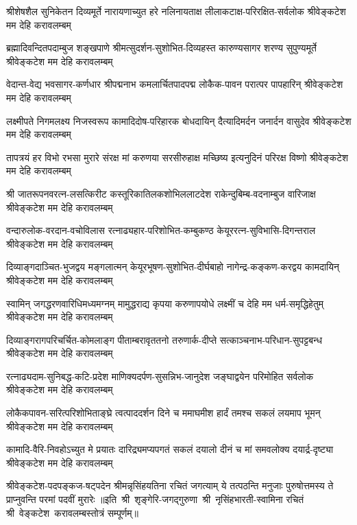 \fourlineindentedshloka
{श्रीशेषशैल सुनिकेतन दिव्यमूर्ते}
{नारायणाच्युत हरे नलिनायताक्ष}
{लीलाकटाक्ष-परिरक्षित-सर्वलोक}
{श्रीवेङ्कटेश मम देहि करावलम्बम्}

\fourlineindentedshloka
{ब्रह्मादिवन्दितपदाम्बुज शङ्खपाणे}
{श्रीमत्सुदर्शन-सुशोभित-दिव्यहस्त}
{कारुण्यसागर शरण्य सुपुण्यमूर्ते}
{श्रीवेङ्कटेश मम देहि करावलम्बम्}

\fourlineindentedshloka
{वेदान्त-वेद्य भवसागर-कर्णधार}
{श्रीपद्मनाभ कमलार्चितपादपद्म}
{लोकैक-पावन परात्पर पापहारिन्}
{श्रीवेङ्कटेश मम देहि करावलम्बम्}

\fourlineindentedshloka
{लक्ष्मीपते निगमलक्ष्य निजस्वरूप}
{कामादिदोष-परिहारक बोधदायिन्}
{दैत्यादिमर्दन जनार्दन वासुदेव}
{श्रीवेङ्कटेश मम देहि करावलम्बम्}

\fourlineindentedshloka
{तापत्रयं हर विभो रभसा मुरारे}
{संरक्ष मां करुणया सरसीरुहाक्ष}
{मच्छिष्य इत्यनुदिनं परिरक्ष विष्णो}
{श्रीवेङ्कटेश मम देहि करावलम्बम्}

\fourlineindentedshloka
{श्री जातरूपनवरत्न-लसत्किरीट}
{कस्तूरिकातिलकशोभिललाटदेश}
{राकेन्दुबिम्ब-वदनाम्बुज वारिजाक्ष}
{श्रीवेङ्कटेश मम देहि करावलम्बम्}

\fourlineindentedshloka
{वन्दारुलोक-वरदान-वचोविलास}
{रत्नाढ्यहार-परिशोभित-कम्बुकण्ठ}
{केयूररत्न-सुविभासि-दिगन्तराल}
{श्रीवेङ्कटेश मम देहि करावलम्बम्}

\fourlineindentedshloka
{दिव्याङ्गदाञ्चित-भुजद्वय मङ्गलात्मन्}
{केयूरभूषण-सुशोभित-दीर्घबाहो}
{नागेन्द्र-कङ्कण-करद्वय कामदायिन्}
{श्रीवेङ्कटेश मम देहि करावलम्बम्}

\fourlineindentedshloka
{स्वामिन् जगद्धरणवारिधिमध्यमग्नम्}
{मामुद्धराद्य कृपया करुणापयोधे}
{लक्ष्मीं च देहि मम धर्म-समृद्धिहेतुम्}
{श्रीवेङ्कटेश मम देहि करावलम्बम्}

\fourlineindentedshloka
{दिव्याङ्गरागपरिचर्चित-कोमलाङ्ग}
{पीताम्बरावृततनो तरुणार्क-दीप्ते}
{सत्काञ्चनाभ-परिधान-सुपट्टबन्ध}
{श्रीवेङ्कटेश मम देहि करावलम्बम्}

\fourlineindentedshloka
{रत्नाढ्यदाम-सुनिबद्ध-कटि-प्रदेश}
{माणिक्यदर्पण-सुसन्निभ-जानुदेश}
{जङ्घाद्वयेन परिमोहित सर्वलोक}
{श्रीवेङ्कटेश मम देहि करावलम्बम्}

\fourlineindentedshloka
{लोकैकपावन-सरित्परिशोभिताङ्घ्रे}
{त्वत्पाददर्शन दिने च ममाघमीश}
{हार्दं तमश्च सकलं लयमाप भूमन्}
{श्रीवेङ्कटेश मम देहि करावलम्बम्}

\fourlineindentedshloka
{कामादि-वैरि-निवहोऽच्युत मे प्रयातः}
{दारिद्र्यमप्यपगतं सकलं दयालो}
{दीनं च मां समवलोक्य दयार्द्र-दृष्ट्या}
{श्रीवेङ्कटेश मम देहि करावलम्बम्}

\fourlineindentedshloka
{श्रीवेङ्कटेश-पदपङ्कज-षट्पदेन}
{श्रीमन्नृसिंहयतिना रचितं जगत्याम्}
{ये तत्पठन्ति मनुजाः पुरुषोत्तमस्य}
{ते प्राप्नुवन्ति परमां पदवीं मुरारेः}
॥इति~श्री~शृङ्गेरि-जगद्गुरुणा~श्री~नृसिंहभारती-स्वामिना रचितं श्री~वेङ्कटेश~करावलम्बस्तोत्रं सम्पूर्णम्॥